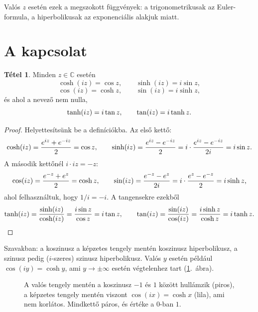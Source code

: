 \documentclass[11pt]{scrartcl}
\theoremstyle{definition}
\newtheorem{theorem}[definition]{Tétel}
\theoremstyle{remark}
\begin{document}
Valós $z$ esetén ezek a megszokott függvények: a trigonometrikusak az
Euler-formula, a hiperbolikusak az exponenciális alakjuk miatt.

\section{A kapcsolat}

\begin{theorem}
	Minden $z \in \mathbb{C}$ esetén
	\[
		\cosh(iz) = \cos z, \qquad \sinh(iz) = i \sin z,
	\]
	\[
		\cos(iz) = \cosh z, \qquad \sin(iz) = i \sinh z,
	\]
	és ahol a nevező nem nulla,
	\[
		\tanh(iz) = i \tan z, \qquad \tan(iz) = i \tanh z\text.
	\]
\end{theorem}

\begin{proof}
	Helyettesítsünk be a definíciókba. Az első kettő:
	\[
		\cosh(iz) = \frac{e^{iz} + e^{-iz}}{2} = \cos z, \qquad
		\sinh(iz) = \frac{e^{iz} - e^{-iz}}{2}
		= i \cdot \frac{e^{iz} - e^{-iz}}{2i} = i \sin z\text.
	\]
	A második kettőnél $i \cdot iz = -z$:
	\[
		\cos(iz) = \frac{e^{-z} + e^{z}}{2} = \cosh z, \qquad
		\sin(iz) = \frac{e^{-z} - e^{z}}{2i}
		= i \cdot \frac{e^{z} - e^{-z}}{2} = i \sinh z\text,
	\]
	ahol felhasználtuk, hogy $1/i = -i$. A tangensekre ezekből
	\[
		\tanh(iz) = \frac{\sinh(iz)}{\cosh(iz)} = \frac{i \sin z}{\cos z}
		= i \tan z, \qquad
		\tan(iz) = \frac{\sin(iz)}{\cos(iz)} = \frac{i \sinh z}{\cosh z}
		= i \tanh z\text.
	\]
\end{proof}

Szavakban: a koszinusz a képzetes tengely mentén koszinusz hiperbolikusz, a
szinusz pedig ($i$-szeres) szinusz hiperbolikusz. Valós $y$ esetén például
$\cos(iy) = \cosh y$, ami $y \to \pm\infty$ esetén végtelenhez tart
(\ref{fig:cos-imaginary}.~ábra).

\begin{figure}[ht]
	\centering
	\caption{A valós tengely mentén a koszinusz $-1$ és $1$ között hullámzik
		(piros), a képzetes tengely mentén viszont $\cos(ix) = \cosh x$
		(lila), ami nem korlátos. Mindkettő páros, és értéke a $0$-ban $1$.}
	\label{fig:cos-imaginary}
\end{figure}
\end{document}
